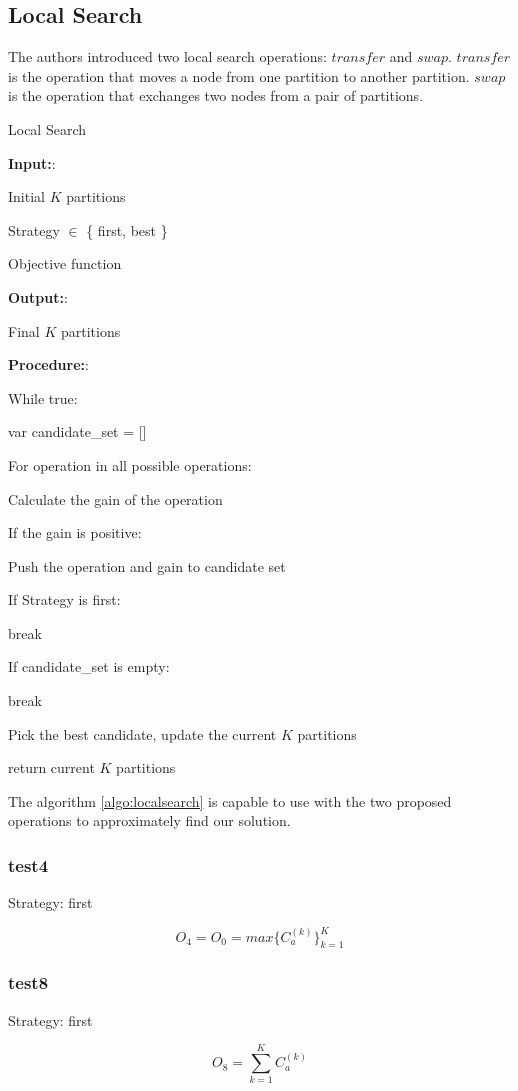 \subsection{Local Search}

The authors \cite{vandermeulen2019balanced} introduced two local search operations: $transfer$ and $swap$. $transfer$ is the operation that moves a node from one partition to another partition. $swap$ is the operation that exchanges two nodes from a pair of partitions.

\begin{algorithm}[H]
\caption{Local Search}
\label{algo:localsearch}
\textbf{Input:}:

    Initial $K$ partitions
    
    Strategy $\in$ \{ first, best \} 
    
    Objective function

\textbf{Output:}:

    Final $K$ partitions
    
\textbf{Procedure:}:

While true:

    \hspace{1cm} var candidate\_set = []

    \hspace{1cm} For operation in all possible operations:
    
        \hspace{2cm} Calculate the gain of the operation
            
        \hspace{2cm} If the gain is positive:
            
            \hspace{3cm} Push the operation and gain to candidate set
                
            \hspace{3cm} If Strategy is first:
                
                \hspace{4cm} break
                
    \hspace{1cm} If candidate\_set is empty:
    
        \hspace{2cm} break
    
    \hspace{1cm} Pick the best candidate, update the current $K$ partitions
    
return current $K$ partitions

\end{algorithm}

The algorithm \ref{algo:localsearch} is capable to use with the two proposed operations to approximately find our solution. 


\subsubsection{test4}

Strategy: first

\[
O_4 = O_0 = max\{C_a^{(k)}\}_{k=1}^{K}
\]

\subsubsection{test8}

Strategy: first

\[
O_8 = \sum_{k=1}^{K} C_a^{(k)}
\]